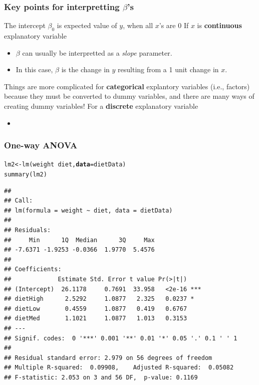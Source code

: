\documentclass[color=usenames,dvipsnames]{beamer}\usepackage[]{graphicx}\usepackage[]{color}
\makeatletter
\newcommand{\hlopt}[1]{\textcolor[rgb]{0,0,0}{#1}}%
\newcommand{\hlstd}[1]{\textcolor[rgb]{0,0,0}{#1}}%
\newcommand{\hlkwb}[1]{\textcolor[rgb]{0,0.341,0.682}{#1}}%
\newcommand{\hlkwc}[1]{\textcolor[rgb]{0,0,0}{\textbf{#1}}}%
\newcommand{\hlkwd}[1]{\textcolor[rgb]{0.004,0.004,0.506}{#1}}%
\newenvironment{kframe}{%
 \def\at@end@of@kframe{}%
 \ifinner\ifhmode%
  \def\at@end@of@kframe{\end{minipage}}%
  \begin{minipage}{\columnwidth}%
 \fi\fi%
 \def\FrameCommand##1{\hskip\@totalleftmargin \hskip-\fboxsep
 \colorbox{shadecolor}{##1}\hskip-\fboxsep
     \hskip-\linewidth \hskip-\@totalleftmargin \hskip\columnwidth}%
 \MakeFramed {\advance\hsize-\width
   \@totalleftmargin\z@ \linewidth\hsize
   \@setminipage}}%
 {\par\unskip\endMakeFramed%
 \at@end@of@kframe}
\newenvironment{knitrout}{}{} %
\makeatother
\begin{document}
\begin{frame}
  \frametitle{Key points for interpretting $\beta$'s}
  The intercept $\beta_0$ is expected value of $y$, when all $x$'s are 0
  \pause
  \vfill
  If $x$ is {\bf continuous} explanatory variable %
  \begin{itemize}
    \item $\beta$ can usually be interpretted as a \textit{slope}
      parameter. 
    \item In this case, $\beta$ is the
      change in $y$ resulting from a 1 unit change in $x$.
  \end{itemize}
  \pause
  \vfill
  Things are more complicated for {\bf categorical} explantory
  variables (i.e., factors) because they must be converted to dummy
  variables, and there are many ways of creating dummy variables!
  \pause
  \vfill
  For a {\bf discrete} explanatory variable %
  \begin{itemize}
    \item 
  \end{itemize}
\end{frame}





\begin{frame}[fragile]
  \frametitle{One-way ANOVA}
  \scriptsize %
\begin{knitrout}\scriptsize
{}\color{fgcolor}\begin{kframe}
\begin{alltt}
\hlstd{lm2} \hlkwb{<-} \hlkwd{lm}\hlstd{(weight} \hlopt{~} \hlstd{diet,} \hlkwc{data}\hlstd{=dietData)}
\hlkwd{summary}\hlstd{(lm2)}
\end{alltt}
\begin{verbatim}
## 
## Call:
## lm(formula = weight ~ diet, data = dietData)
## 
## Residuals:
##     Min      1Q  Median      3Q     Max 
## -7.6371 -1.9253 -0.0366  1.9770  5.4576 
## 
## Coefficients:
##             Estimate Std. Error t value Pr(>|t|)    
## (Intercept)  26.1178     0.7691  33.958   <2e-16 ***
## dietHigh      2.5292     1.0877   2.325   0.0237 *  
## dietLow       0.4559     1.0877   0.419   0.6767    
## dietMed       1.1021     1.0877   1.013   0.3153    
## ---
## Signif. codes:  0 '***' 0.001 '**' 0.01 '*' 0.05 '.' 0.1 ' ' 1
## 
## Residual standard error: 2.979 on 56 degrees of freedom
## Multiple R-squared:  0.09908,	Adjusted R-squared:  0.05082 
## F-statistic: 2.053 on 3 and 56 DF,  p-value: 0.1169
\end{verbatim}
\end{kframe}
\end{knitrout}
\end{frame}
\end{document}
